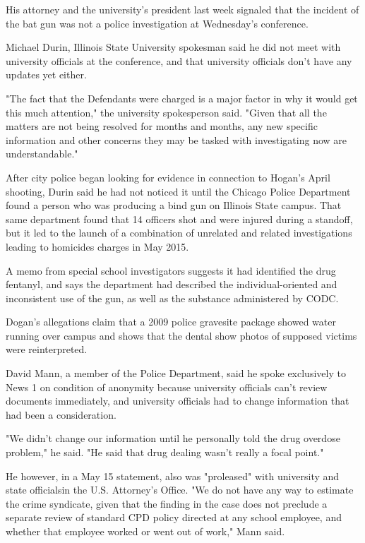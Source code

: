 \documentclass{article} %
\begin{document}
{\begin{appendices}
{His attorney and the university's president last week signaled that the incident of the bat gun was not a police investigation at Wednesday's conference.

Michael Durin, Illinois State University spokesman said he did not meet with university officials at the conference, and that university officials don't have any updates yet either.

"The fact that the Defendants were charged is a major factor in why it would get this much attention," the university spokesperson said. "Given that all the matters are not being resolved for months and months, any new specific information and other concerns they may be tasked with investigating now are understandable."

After city police began looking for evidence in connection to Hogan's April shooting, Durin said he had not noticed it until the Chicago Police Department found a person who was producing a bind gun on Illinois State campus. That same department found that 14 officers shot and were injured during a standoff, but it led to the launch of a combination of unrelated and related investigations leading to homicides charges in May 2015.

A memo from special school investigators suggests it had identified the drug fentanyl, and says the department had described the individual-oriented and inconsistent use of the gun, as well as the substance administered by CODC.

Dogan's allegations claim that a 2009 police gravesite package showed water running over campus and shows that the dental show photos of supposed victims were reinterpreted.

David Mann, a member of the Police Department, said he spoke exclusively to News 1 on condition of anonymity because university officials can't review documents immediately, and university officials had to change information that had been a consideration.

"We didn't change our information until he personally told the drug overdose problem," he said. "He said that drug dealing wasn't really a focal point."

He however, in a May 15 statement, also was "proleased" with university and state officialsin the U.S. Attorney's Office. "We do not have any way to estimate the crime syndicate, given that the finding in the case does not preclude a separate review of standard CPD policy directed at any school employee, and whether that employee worked or went out of work," Mann said.

}
\end{appendices}}
\end{document}
